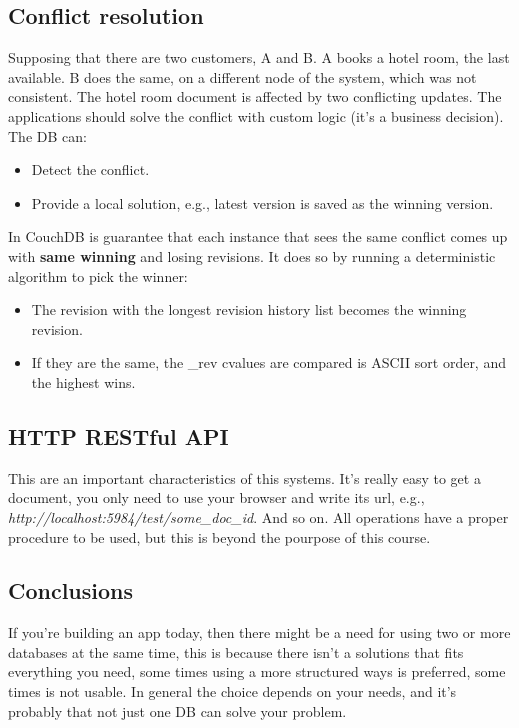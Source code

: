 \documentclass[12pt]{article}
\begin{document}
\subsection{Conflict resolution}
Supposing that there are two customers, A and B. A books a hotel room, the last available. B does the same, on a different node of the system, which was not consistent. The hotel room document is affected by two conflicting updates. The applications should solve the conflict with custom logic (it's a business decision). The DB can:
\begin{itemize}
  \item Detect the conflict.
  \item Provide a local solution, e.g., latest version is saved as the winning version.
\end{itemize}
In CouchDB is guarantee that each instance that sees the same conflict comes up with \textbf{same winning} and losing revisions. It does so by running a deterministic algorithm to pick the winner:
\begin{itemize}
  \item The revision with the longest revision history list becomes the winning revision.
  \item If they are the same, the \_rev cvalues are compared is ASCII sort order, and the highest wins.
\end{itemize}

\subsection{HTTP RESTful API}
This are an important characteristics of this systems. It's really easy to get a document, you only need to use your browser and write its url, e.g., \textit{http://localhost:5984/test/some\_doc\_id}. And so on. All operations have a proper procedure to be used, but this is beyond the pourpose of this course.

\subsection{Conclusions} If you're building an app today, then there might be a need for using two or more databases at the same time, this is because there isn't a solutions that fits everything you need, some times using a more structured ways is preferred, some times is not usable. In general the choice depends on your needs, and it's probably that not just one DB can solve your problem.

\newpage
\end{document}
